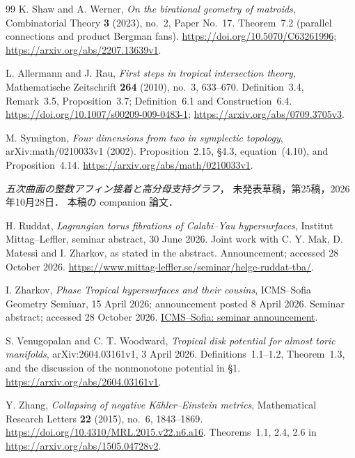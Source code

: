 \begin{thebibliography}{99}
K. Shaw and A. Werner,
\emph{On the birational geometry of matroids},
Combinatorial Theory \textbf{3} (2023), no.~2, Paper No.~17.
Theorem~7.2 (parallel connections and product Bergman fans).
\url{https://doi.org/10.5070/C63261996};
\url{https://arxiv.org/abs/2207.13639v1}.

L. Allermann and J. Rau,
\emph{First steps in tropical intersection theory},
Mathematische Zeitschrift \textbf{264} (2010), no.~3, 633--670.
Definition~3.4, Remark~3.5, Proposition~3.7;
Definition~6.1 and Construction~6.4.
\url{https://doi.org/10.1007/s00209-009-0483-1};
\url{https://arxiv.org/abs/0709.3705v3}.

M. Symington,
\emph{Four dimensions from two in symplectic topology},
arXiv:math/0210033v1 (2002).
Proposition~2.15, \S4.3, equation~(4.10), and Proposition~4.14.
\url{https://arxiv.org/abs/math/0210033v1}.

\emph{五次曲面の整数アフィン接着と高分母支持グラフ}，
未発表草稿，第25稿，2026年10月28日．
本稿の companion 論文．


H. Ruddat,
\emph{Lagrangian torus fibrations of Calabi--Yau hypersurfaces},
Institut Mittag--Leffler, seminar abstract, 30 June 2026.
Joint work with C. Y. Mak, D. Matessi and I. Zharkov, as stated in the abstract.
Announcement; accessed 28 October 2026.
\url{https://www.mittag-leffler.se/seminar/helge-ruddat-tba/}.

I. Zharkov,
\emph{Phase Tropical hypersurfaces and their cousins},
ICMS--Sofia Geometry Seminar, 15 April 2026; announcement posted 8 April 2026.
Seminar abstract; accessed 28 October 2026.
\href{https://icms.bg/phase-tropical-hypersurfaces-and-their-cousins-geometry-seminar-talk-by-ilia-zharkov/}{ICMS--Sofia: seminar announcement}.


S. Venugopalan and C. T. Woodward,
\emph{Tropical disk potential for almost toric manifolds},
arXiv:2604.03161v1, 3 April 2026.
Definitions~1.1--1.2, Theorem~1.3, and the discussion of the nonmonotone potential in \S1.
\url{https://arxiv.org/abs/2604.03161v1}.

Y. Zhang,
\emph{Collapsing of negative Kähler--Einstein metrics},
Mathematical Research Letters \textbf{22} (2015), no.~6, 1843--1869.
\url{https://doi.org/10.4310/MRL.2015.v22.n6.a16}.
Theorems~1.1, 2.4, 2.6 in \url{https://arxiv.org/abs/1505.04728v2}.


\end{thebibliography}
